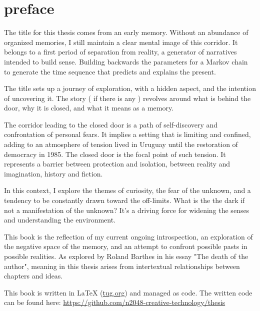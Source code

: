 \chapter*{preface}
\normalsize

\newpage  %
The title for this thesis comes from an early memory. Without an abundance of organized memories, I still maintain a clear mental image of this corridor. It belongs to a first period of separation from reality, a generator of narratives intended to build sense. Building backwards the parameters for a Markov chain to generate the time sequence that predicts and explains the present.    

The title sets up a journey of exploration, with a hidden aspect, and the intention of uncovering it. The story ( if there is any ) {r}evolves around what is behind the door, why it is closed, and what it means as a memory.

The corridor leading to the closed door is a path of self-discovery and confrontation of personal fears. It implies a setting that is limiting and confined, adding to an atmosphere of tension lived in Uruguay until the restoration of democracy in 1985. The closed door is the focal point of such tension. It represents a barrier between protection and isolation, between reality and imagination, history and fiction.

In this context, I explore the themes of curiosity, the fear of the unknown, and a tendency to be constantly drawn toward the off-limits. What is the the dark if not a manifestation of the unknown? It's a driving force for widening the senses and understanding the environment.

This book is the reflection of my current ongoing introspection, an exploration of the negative space of the memory, and an attempt to confront possible pasts in possible realities. As explored by Roland Barthes in his essay "The death of the author"\citep{barthes1967}, meaning in this thesis arises from intertextual relationships between chapters and ideas. 

This book is written in \LaTeX{} (\href{https://www.tug.org/texlive/quickinstall.html}{tug.org}) and managed as code. The written code can be found here: \href{https://github.com/n2048-creative-technology/thesis}{https://github.com/n2048-creative-technology/thesis} 

 